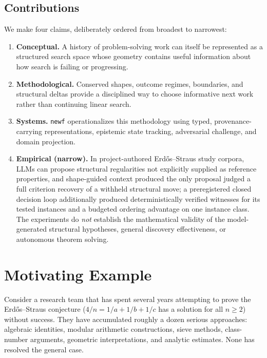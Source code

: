 \documentclass[11pt]{article}
\theoremstyle{gowthm}
\theoremstyle{gowplain}
\begin{document}
\subsection{Contributions}

We make four claims, deliberately ordered from broadest to narrowest:

\begin{enumerate}[label=\textbf{C\arabic*.}]
  \item \textbf{Conceptual.} A history of problem-solving work can itself be
    represented as a structured search space whose geometry contains useful
    information about how search is failing or progressing.
  \item \textbf{Methodological.} Conserved shapes, outcome regimes, boundaries,
    and structural deltas provide a disciplined way to choose informative next
    work rather than continuing linear search.
  \item \textbf{Systems.} \texttt{newf} operationalizes this methodology using
    typed, provenance-carrying representations, epistemic state tracking,
    adversarial challenge, and domain projection.
  \item \textbf{Empirical (narrow).} In project-authored Erd\H{o}s--Straus study
    corpora, LLMs can propose structural regularities not explicitly supplied as
    reference properties, and shape-guided context produced the only proposal
    judged a full criterion recovery of a withheld structural move; a
    preregistered closed decision loop additionally produced deterministically
    verified witnesses for its tested instances and a budgeted ordering
    advantage on one instance class. The experiments do \emph{not} establish
    the mathematical validity of the model-generated structural hypotheses,
    general discovery effectiveness, or autonomous theorem solving.
\end{enumerate}

\section{Motivating Example}
\label{sec:example}

Consider a research team that has spent several years attempting to prove the
Erd\H{o}s--Straus conjecture ($4/n = 1/a + 1/b + 1/c$ has a solution for all
$n \geq 2$)~\cite{elsholtz2024erdos} without success. They have accumulated roughly a dozen serious
approaches: algebraic identities, modular arithmetic constructions, sieve
methods, class-number arguments, geometric interpretations, and analytic
estimates. None has resolved the general case.
\end{document}
